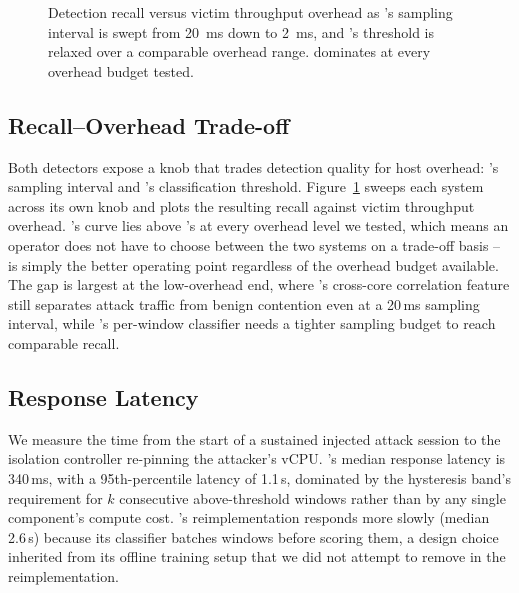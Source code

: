 \begin{figure}[t]
\centering
{}
\caption{Detection recall versus victim throughput overhead as \sysname's sampling interval
is swept from 20~ms down to 2~ms, and \baseline's threshold is relaxed over a comparable
overhead range. \sysname{} dominates at every overhead budget tested.}
\label{fig:tradeoff}
\end{figure}

\subsection{Recall--Overhead Trade-off}

Both detectors expose a knob that trades detection quality for host overhead: \sysname's
sampling interval and \baseline's classification threshold. Figure~\ref{fig:tradeoff} sweeps
each system across its own knob and plots the resulting recall against victim throughput
overhead. \sysname's curve lies above \baseline's at every overhead level we tested, which
means an operator does not have to choose between the two systems on a trade-off basis --
\sysname{} is simply the better operating point regardless of the overhead budget available.
The gap is largest at the low-overhead end, where \sysname's cross-core correlation feature
still separates attack traffic from benign contention even at a 20\,ms sampling interval,
while \baseline's per-window classifier needs a tighter sampling budget to reach comparable
recall.

\subsection{Response Latency}

We measure the time from the start of a sustained injected attack session to the isolation
controller re-pinning the attacker's vCPU. \sysname's median response latency is 340\,ms,
with a 95th-percentile latency of 1.1\,s, dominated by the hysteresis band's requirement for
$k$ consecutive above-threshold windows rather than by any single component's compute cost.
\baseline{}'s reimplementation responds more slowly (median 2.6\,s) because its classifier
batches windows before scoring them, a design choice inherited from its offline training
setup that we did not attempt to remove in the reimplementation.
